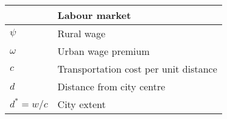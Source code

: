 \begin{longtable}{lp{10cm}}
\hline           &  \textbf{Labour market}      \\ \hline %
$\psi$           &  Rural wage                  \\  
$\omega$         &  Urban wage premium          \\
${c}$            &  Transportation cost per unit distance \\ %
$d$              &  Distance from city centre   \\
$d^* = w/{c}$    &  City extent \\ %


\end{longtable}
